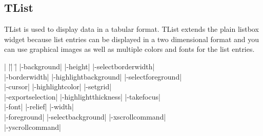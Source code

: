 \subsection*{TList}
TList is used to display data in a tabular format. TList extends the plain
listbox widget because list entries can be displayed in a two dimensional
format and you can use graphical images as well as multiple colors and fonts
for the list entries.
\vskip5pt
\vspace{-4pt}

\begin{tabbing}
|                    |\=|                    |\= \kill                    
|-background|        \> |-height|             \> |-selectborderwidth| \\
|-borderwidth|       \> |-highlightbackground| \> |-selectforeground| \\
|-cursor|	     \> |-highlightcolor|     \> |-setgrid| \\         
|-exportselection|   \> |-highlightthickness| \> |-takefocus| \\
|-font|              \> |-relief|             \> |-width| \\           
|-foreground|        \> |-selectbackground|   \> |-xscrollcommand| \\  
\> \> |-yscrollcommand| \\  
\end{tabbing}

